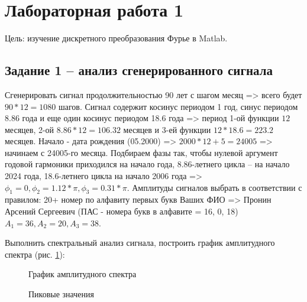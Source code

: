 \documentclass[a4paper,oneside,14pt]{extreport}
\begin{document}
\chapter*{Лабораторная работа 1}
Цель: изучение дискретного преобразования Фурье в Matlab.
\section*{Задание 1 – анализ сгенерированного сигнала}
Сгенерировать сигнал продолжительностью 90 лет с шагом месяц => всего будет $90*12=1080$ шагов. Сигнал содержит косинус периодом 1 год, синус периодом 8.86 года и еще один косинус периодом 18.6 года => период 1-ой функции $12$ месяцев, 2-ой $8.86*12=106.32$ месяцев и 3-ей функции $12*18.6=223.2$ месяцев. Начало - дата рождения (05.2000) => $2000*12+5=24005$ => начинаем с 24005-го месяца. Подбираем фазы так, чтобы нулевой аргумент годовой гармоники приходился на начало года,  8.86-летнего цикла – на начало 2024 года, 18.6-летнего цикла на начало 2006 года => $\phi_1=0, \phi_2=1.12*\pi, \phi_3=0.31*\pi$. Амплитуды сигналов выбрать в соответствии с правилом: 20+ номер по алфавиту первых букв Ваших ФИО => Пронин Арсений Сергеевич (ПАС - номера букв в алфавите = 16, 0, 18) $A_1=36, A_2=20, A_3=38$.

Выполнить спектральный анализ сигнала, построить график амплитудного спектра (рис. \ref{task1_ampl_spectr}):
\newline
\begin{figure}[h]
	\caption{График амплитудного спектра}
	\label{task1_ampl_spectr}
\end{figure}

\begin{figure}[h]
	\caption{Пиковые значения}
	\label{task1_ampl_spectr_vals}
\end{figure}
\end{document}
